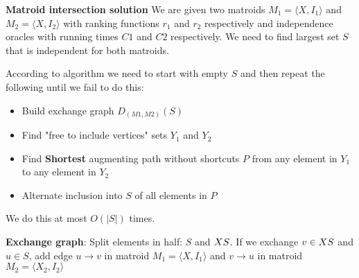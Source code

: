 \documentclass[a4paper]{article}
\begin{document}
\begin{landscape}
\begin{multicols}{2}
\begin{itemize}
\textbf{Matroid intersection solution}
We are given two matroids $M_1=⟨X,I_1⟩$ and $M_2=⟨X,I_2⟩$ with ranking functions $r_1$ and $r_2$ respectively and independence oracles with running times $C1$ and $C2$ respectively. We need to find largest set $S$ that is independent for both matroids.

According to algorithm we need to start with empty $S$ and then repeat the following until we fail to do this:

\begin{itemize}
    \item Build exchange graph $D_{(M1,M2)}(S)$
    \item Find "free to include vertices" sets $Y_1$ and $Y_2$
    \item Find \textbf{Shortest} augmenting path without shortcuts $P$ from any element in $Y_1$ to any element in $Y_2$
    \item Alternate inclusion into $S$ of all elements in $P$
\end{itemize}

We do this at most $O(|S|)$ times.

\textbf{Exchange graph}: Split elements in half: $S$ and $X \\ S$. If we exchange $v \in X \\ S$ and $u \in S$, add edge $u\rightarrow v$ in matroid $M_1=⟨X,I_1⟩$ and $v\rightarrow u$ in matroid $M_2=⟨X_2,I_2⟩$

\end{itemize}

\end{multicols}
\end{landscape}
\end{document}
